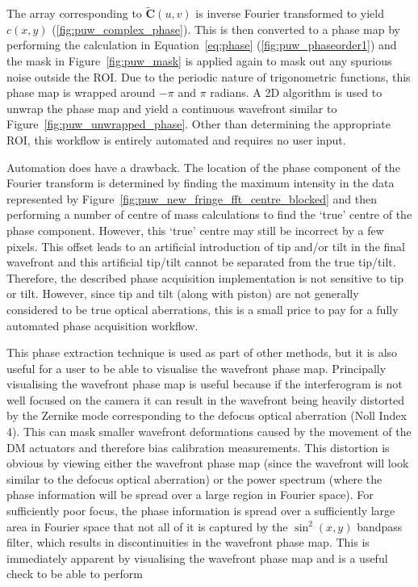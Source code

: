The array corresponding to $\tilde{\boldsymbol{C}}(u,v)$ is inverse Fourier transformed to yield $c(x,y)$ (\ref{fig:puw_complex_phase}). This is then converted to a phase map by performing the calculation in Equation~\ref{eq:phase} (\ref{fig:puw_phaseorder1}) and the mask in Figure~\ref{fig:puw_mask} is applied again to mask out any spurious noise outside the ROI. Due to the periodic nature of trigonometric functions, this phase map is wrapped around $-\pi$ and $\pi$ radians. A 2D  algorithm is used to unwrap the phase map and yield a continuous wavefront similar to  Figure~\ref{fig:puw_unwrapped_phase}\cite{herraez2002fast}. Other than determining the appropriate ROI, this workflow is entirely automated and requires no user input. 

Automation does have a drawback. The location of the phase component
of the Fourier transform is determined by finding the maximum
intensity in the data represented by
Figure~\ref{fig:puw_new_fringe_fft_centre_blocked} and then performing
a number of centre of mass calculations to find the `true' centre of
the phase component. However, this `true' centre may still be
incorrect by a few pixels. This offset leads to an artificial
introduction of tip and/or tilt in the final wavefront and this
artificial tip/tilt cannot be separated from the true
tip/tilt. Therefore, the described phase acquisition implementation is
not sensitive to tip or tilt. However, since tip and tilt (along with piston) are not generally considered to be true optical aberrations, this is a small price to pay for a fully automated phase acquisition workflow.

This phase extraction technique is used as part of other methods, but it is also useful for a user to be able to visualise the wavefront phase map. Principally visualising the wavefront phase map is useful because if the interferogram is not well focused on the camera it can result in the wavefront being heavily distorted by the Zernike mode corresponding to the defocus optical aberration (Noll Index 4). This can mask smaller wavefront deformations caused by the movement of the DM actuators and therefore bias calibration measurements. This distortion is obvious by viewing either the wavefront phase map (since the wavefront will look similar to the defocus optical aberration) or the power spectrum (where the phase information will be spread over a large region in Fourier space). For sufficiently poor focus, the phase information is spread over a sufficiently large area in Fourier space that not all of it is captured by the $\sin^{2}(x,y)$ bandpass filter, which results in discontinuities in the wavefront phase map. This is immediately apparent by visualising the wavefront phase map and is a useful check to be able to perform

